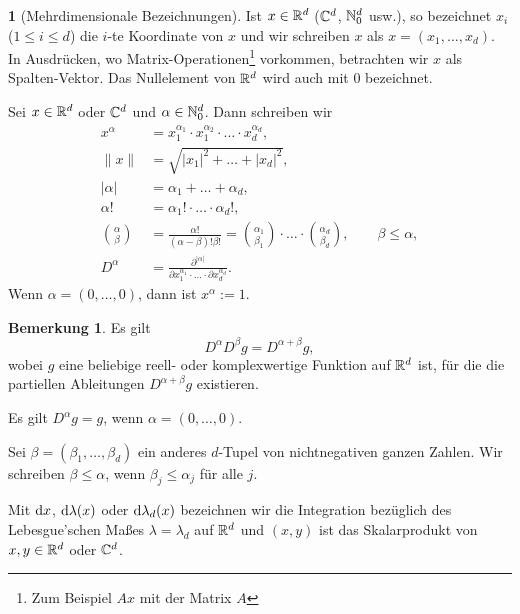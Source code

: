 \documentclass[
 a4paper,
 12pt,
 parskip=half
 ]{scrreprt}
\theoremstyle{plain}
\theoremstyle{definition}
\newtheorem{prgp}[thm]{} %
\newtheorem*{rmrk*}{Bemerkung}
\numberwithin{equation}{section}
\begin{document}
\begin{prgp}[Mehrdimensionale Bezeichnungen]
  Ist $x \in \mathbb{R}^d$ ($\mathbb{C}^d$, $\mathbb{N}_0^d$ usw.), so bezeichnet $x_i$ ($1
  \le i \le d$) die $i$-te Koordinate von $x$ und wir schreiben $x$ als $x =
  (x_1, \ldots, x_d)$. In Ausdrücken, wo Matrix-Operationen\footnote{%
    Zum Beispiel $Ax$ mit der Matrix $A$}
  vorkommen, betrachten wir $x$ als Spalten-Vektor. Das Nullelement von
  $\mathbb{R}^d$ wird auch mit 0 bezeichnet.

  Sei $x \in \mathbb{R}^d$ oder $\mathbb{C}^d$ und $\alpha \in \mathbb{N}_0^d$. Dann
  schreiben wir
  \begin{align*}
    x^\alpha
    &= x_1^{\alpha_1} \cdot x_1^{\alpha_2} \cdot \ldots \cdot x_d^{\alpha_d}, \\
    \| x \|
    &= \sqrt{|x_1|^2 + \ldots + |x_d|^2}, \\
    |\alpha|
    &= \alpha_1 + \ldots + \alpha_d, \\
    \alpha!
    &= \alpha_1! \cdot \ldots \cdot \alpha_d!, \\
    \binom{\alpha}{\beta}
    &= \frac{\alpha!}{(\alpha-\beta)! \beta!}
      = \binom{\alpha_1}{\beta_1} \cdot \ldots \cdot
      \binom{\alpha_d}{\beta_d}, \qquad \beta \le \alpha, \\
    D^\alpha
    &= \frac{\partial^{|\alpha|}}
      {\partial x_1^{\alpha_1} \cdot \ldots \cdot \partial x_d^{\alpha_d}}.
  \end{align*}
  Wenn $\alpha = (0, \ldots, 0)$, dann ist $x^\alpha := 1$.
\end{prgp}

\begin{rmrk*}
  Es gilt
  \[ D^\alpha D^\beta g = D^{\alpha + \beta} g, \]
  wobei $g$ eine beliebige reell- oder komplexwertige Funktion auf $\mathbb{R}^d$
  ist, für die die partiellen Ableitungen $D^{\alpha + \beta} g$ existieren.

  Es gilt $D^\alpha g = g$, wenn $\alpha = (0, \ldots, 0)$.

  Sei $\beta = (\beta_1, \ldots, \beta_d)$ ein anderes $d$-Tupel von
  nichtnegativen ganzen Zahlen. Wir schreiben $\beta \le \alpha$, wenn $\beta_j
  \le \alpha_j$ für alle $j$.

  Mit $\mathrm{d} x$, $\mathrm{d} \lambda(x)$ oder $\mathrm{d} \lambda_d(x)$ bezeichnen
  wir die Integration bezüglich des Lebesgue'schen Maßes $\lambda = \lambda_d$
  auf $\mathbb{R}^d$ und $(x,y)$ ist das Skalarprodukt von $x, y \in \mathbb{R}^d$ oder
  $\mathbb{C}^d$.
\end{rmrk*}
\end{document}

